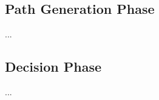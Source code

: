 \documentclass[12pt]{article}
\begin{document}
\subsection{Path Generation Phase}\label{subsec:path-gen}
...

\subsection{Decision Phase}\label{subsec:decision}
...
\end{document}
